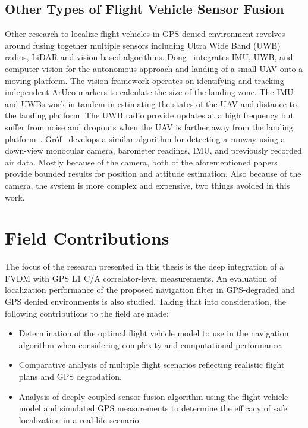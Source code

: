 \subsection{\textbf{Other Types of Flight Vehicle Sensor Fusion}}
Other research to localize flight vehicles in GPS-denied environment revolves around fusing together multiple sensors including Ultra Wide Band (UWB) radios, LiDAR and vision-based algorithms. Dong~\cite{dongIntegratedUWBIMUVisionFramework2022} integrates IMU, UWB, and computer vision for the autonomous approach and landing of a small UAV onto a moving platform. The vision framework operates on identifying and tracking independent ArUco markers to calculate the size of the landing zone. The IMU and UWBs work in tandem in estimating the states of the UAV and distance to the landing platform. The UWB radio provide updates at a high frequency but suffer from noise and dropouts when the UAV is farther away from the landing platform~\cite{dongIntegratedUWBIMUVisionFramework2022}. Gr\'of~\cite{grofPositioningAircraftRelative2022} develops a similar algorithm for detecting a runway using a down-view monocular camera, barometer readings, IMU, and previously recorded air data. Mostly because of the camera, both of the aforementioned papers provide bounded results for position and attitude estimation. Also because of the camera, the system is more complex and expensive, two things avoided in this work.

\section{\textbf{Field Contributions}}
The focus of the research presented in this thesis is the deep integration of a FVDM with GPS L1 C/A correlator-level measurements. An evaluation of localization performance of the proposed navigation filter in GPS-degraded and GPS denied environments is also studied. Taking that into consideration, the following contributions to the field are made:
\begin{itemize}
    \item Determination of the optimal flight vehicle model to use in the navigation algorithm when considering complexity and computational performance.
    \item Comparative analysis of multiple flight scenarios reflecting realistic flight plans and GPS degradation.
    \item Analysis of deeply-coupled sensor fusion algorithm using the flight vehicle model and simulated GPS measurements to determine the efficacy of safe localization in a real-life scenario.
\end{itemize}

